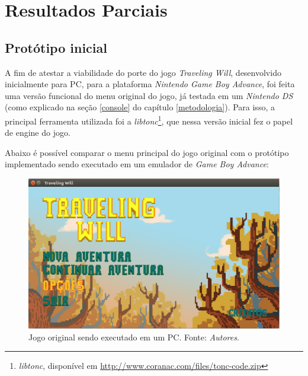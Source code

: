 \chapter[Resultados Parciais]{Resultados Parciais}

\section{Protótipo inicial}

A fim de atestar a viabilidade do porte do jogo \textit{Traveling Will}, desenvolvido inicialmente para PC, para a plataforma \textit{Nintendo Game Boy Advance}, foi feita uma versão funcional do menu original do jogo, já testada em um \textit{Nintendo DS} (como explicado na seção \ref{console} do capítulo \ref{metodologia}). Para isso, a principal ferramenta utilizada foi a \textit{libtonc}\footnote{\textit{libtonc}, disponível em \url{http://www.coranac.com/files/tonc-code.zip}}, que nessa versão inicial fez o papel de engine do jogo.

Abaixo é possível comparar o menu principal do jogo original com o protótipo implementado sendo executado em um emulador de \textit{Game Boy Advance}:

\begin{figure}[H]
 \centering \includegraphics[keepaspectratio=true,scale=0.6]{figuras/tw-original-1.eps}
   \caption[Jogo original sendo executado em um PC]
    {Jogo original sendo executado em um PC. Fonte: \textit{Autores}.}
   \label{tw-original-1}
\end{figure}

